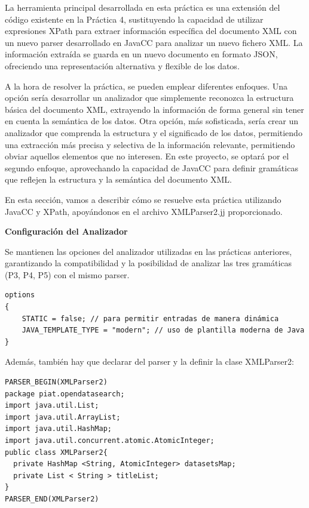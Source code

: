 \noindent La herramienta principal desarrollada en esta práctica es una extensión del código existente en la Práctica 4, sustituyendo la capacidad de utilizar expresiones XPath para extraer información específica del documento XML con un nuevo parser desarrollado en JavaCC para analizar un nuevo fichero XML. La información extraída se guarda en un nuevo documento en formato JSON, ofreciendo una representación alternativa y flexible de los datos.

A la hora de resolver la práctica, se pueden emplear diferentes enfoques. Una opción sería desarrollar un analizador que simplemente reconozca la estructura básica del documento XML, extrayendo la información de forma general sin tener en cuenta la semántica de los datos. Otra opción, más sofisticada, sería crear un analizador que comprenda la estructura y el significado de los datos, permitiendo una extracción más precisa y selectiva de la información relevante, permitiendo obviar aquellos elementos que no interesen. En este proyecto, se optará por el segundo enfoque, aprovechando la capacidad de JavaCC para definir gramáticas que reflejen la estructura y la semántica del documento XML.

En esta sección, vamos a describir cómo se resuelve esta práctica utilizando JavaCC y XPath, apoyándonos en el archivo XMLParser2.jj proporcionado.

\phantom{text}

\noindent \textbf{Configuración del Analizador}

\phantom{text}

Se mantienen las opciones del analizador utilizadas en las prácticas anteriores, garantizando la compatibilidad y la posibilidad de analizar las tres gramáticas (P3, P4, P5) con el mismo parser.

\lstset{inputencoding=utf8/latin1}
\begin{lstlisting}
options
{
    STATIC = false; // para permitir entradas de manera dinámica
    JAVA_TEMPLATE_TYPE = "modern"; // uso de plantilla moderna de Java
}
\end{lstlisting}


Además, también hay que declarar del parser y la definir la clase XMLParser2:
\lstset{inputencoding=utf8/latin1}
\begin{lstlisting}
PARSER_BEGIN(XMLParser2)
package piat.opendatasearch;
import java.util.List;
import java.util.ArrayList;
import java.util.HashMap;
import java.util.concurrent.atomic.AtomicInteger;
public class XMLParser2{
  private HashMap <String, AtomicInteger> datasetsMap;
  private List < String > titleList;
}
PARSER_END(XMLParser2) 
\end{lstlisting}

